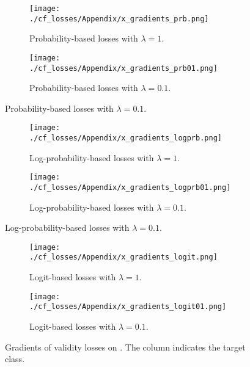 \documentclass[../main.tex]{subfiles}
\begin{document}
\begin{figure}
    \centering

    \begin{subfigure}[b]{\textwidth}
        \centering
        \texttt{[image: ./cf\_losses/Appendix/x\_gradients\_prb.png]}
        \caption{Probability-based losses with $\lambda=1$.}
    \end{subfigure}
    \begin{subfigure}[b]{\textwidth}
        \centering
        \texttt{[image: ./cf\_losses/Appendix/x\_gradients\_prb01.png]}
        \caption{Probability-based losses with $\lambda=0.1$.}
    \end{subfigure}
\end{figure}
\begin{figure}\ContinuedFloat
    \centering
    \begin{subfigure}[b]{\textwidth}
        \centering
        \texttt{[image: ./cf\_losses/Appendix/x\_gradients\_logprb.png]}
        \caption{Log-probability-based losses with $\lambda=1$.}
    \end{subfigure}
    \begin{subfigure}[b]{\textwidth}
        \centering
        \texttt{[image: ./cf\_losses/Appendix/x\_gradients\_logprb01.png]}
        \caption{Log-probability-based losses with $\lambda=0.1$.}
    \end{subfigure}
\end{figure}
\begin{figure}\ContinuedFloat
    \begin{subfigure}[b]{\textwidth}
        \centering
        \texttt{[image: ./cf\_losses/Appendix/x\_gradients\_logit.png]}
        \caption{Logit-based losses with $\lambda=1$.}
    \end{subfigure}
    \begin{subfigure}[b]{\textwidth}
        \centering
        \texttt{[image: ./cf\_losses/Appendix/x\_gradients\_logit01.png]}
        \caption{Logit-based losses with $\lambda=0.1$.}
    \end{subfigure}

    \caption{Gradients of validity losses on \CakeOnSea. The column indicates the target class.}
\end{figure}
\end{document}
